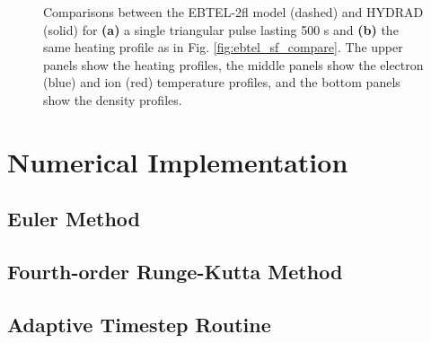 \begin{figure}
	\centering
	\caption{Comparisons between the EBTEL-2fl model (dashed) and HYDRAD (solid) for \textbf{(a)} a single triangular pulse lasting 500 s and \textbf{(b)} the same heating profile as in Fig. \ref{fig:ebtel_sf_compare}. The upper panels show the heating profiles, the middle panels show the electron (blue) and ion (red) temperature profiles, and the bottom panels show the density profiles.}
	\label{fig:ebtel_tf_compare}
\end{figure}
%
\section{Numerical Implementation}
\label{sec:numerical}
%
\subsection{Euler Method}
\label{subsec:euler}
%
\subsection{Fourth-order Runge-Kutta Method}
\label{subsec:rk4}
%
\subsection{Adaptive Timestep Routine}
\label{subsec:adapt}
%